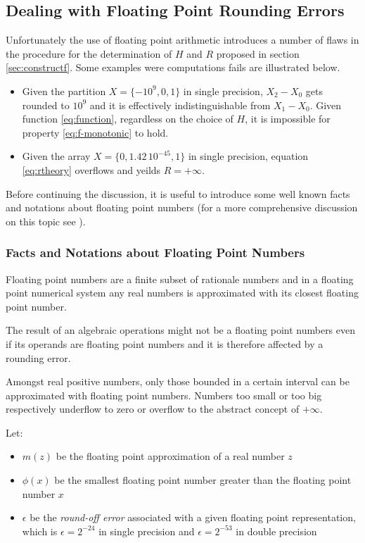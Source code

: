 \documentclass[preprint,1p,times]{elsarticle}
\begin{document}
\subsection{Dealing with Floating Point Rounding Errors}
\label{sec:rounding}

Unfortunately the use of floating point arithmetic introduces a number of flaws in the procedure for the determination of $H$ and $R$ proposed in section \ref{sec:constructf}. 
Some examples were computations fails are illustrated below.
\begin{itemize}
	\item Given the partition $X=\{-10^{9}, 0, 1\}$ in single precision, $X_2-X_0$ gets rounded to $10^9$ and it is effectively indistinguishable from $X_1-X_0$. Given function \eqref{eq:function}, regardless on the choice of $H$, it is impossible for property \eqref{eq:f-monotonic} to hold.
	\item Given the array $X=\{0, 1.42\,10^{-45} ,1\}$ in single precision, equation \eqref{eq:rtheory} overflows and yeilds $R = +\infty$.
\end{itemize}

Before continuing the discussion, it is useful to introduce some well known facts and notations about floating point numbers (for a more comprehensive discussion on this topic see \cite{Goldberg1991}).

\subsubsection{Facts and Notations about Floating Point Numbers}
Floating point numbers are a finite subset of rationale numbers and in a floating point numerical system any real numbers is approximated with its closest floating point number.

The result of an algebraic operations might not be a floating point numbers even if its operands are floating point numbers and it is therefore affected by a rounding error.

Amongst real positive numbers, only those bounded in a certain interval can be approximated with floating point numbers. Numbers too small or too big respectively underflow to zero or overflow to the abstract concept of $+\infty$.

Let: 
\begin{itemize}
\item $m(z)$ be the floating point approximation of a real number $z$
\item $\phi(x)$ be the smallest floating point number greater than the floating point number $x$
\item $\epsilon$ be the \textit{round-off error} associated with a given floating point representation, which is $\epsilon=2^{-24}$ in single precision and $\epsilon=2^{-53}$ in double precision
\end{itemize}
\end{document}
